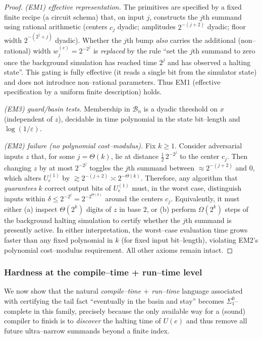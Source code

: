 \documentclass[12pt]{article}
\theoremstyle{definition}
\theoremstyle{plain}
\begin{document}
\begin{proof}
\emph{(EM1) effective representation.} The primitives are specified by a fixed finite recipe (a circuit schema) that, on input $j$, constructs the $j$th summand using rational arithmetic (centers $c_j$ dyadic; amplitudes $2^{-(j+2)}$ dyadic; floor width $2^{-(2^{j}+j)}$ dyadic). Whether the $j$th bump \emph{also} carries the additional (non–rational) width $w_j^{(e)}=2^{-2^{j}}$ is \emph{replaced} by the rule “set the $j$th summand to zero once the background simulation has reached time $2^j$ and has observed a halting state”. This gating is fully effective (it reads a single bit from the simulator state) and does not introduce non–rational parameters. Thus EM1 (effective specification by a uniform finite description) holds.

\emph{(EM3) guard/basin tests.} Membership in $\mathcal B_n$ is a dyadic threshold on $x$ (independent of $z$), decidable in time polynomial in the state bit–length and $\log(1/\varepsilon)$.

\emph{(EM2) failure (no polynomial cost–modulus).} Fix $k\ge1$. Consider adversarial inputs $z$ that, for some $j=\Theta(k)$, lie at distance $\tfrac12\,2^{-2^j}$ to the center $c_j$. Then changing $z$ by at most $2^{-2^j}$ toggles the $j$th summand between $\approx 2^{-(j+2)}$ and $0$, which alters $U_e^{(1)}$ by $\gtrsim 2^{-(j+2)}\asymp 2^{-\Theta(k)}$. Therefore, any algorithm that \emph{guarantees} $k$ correct output bits of $U_e^{(1)}$ must, in the worst case, distinguish inputs within $\delta\le 2^{-2^j}=2^{-2^{\Theta(k)}}$ around the centers $c_j$. Equivalently, it must either (a) inspect $\Theta(2^{k})$ digits of $z$ in base $2$, or (b) perform $\Omega(2^{k})$ steps of the background halting simulation to certify whether the $j$th summand is presently active. In either interpretation, the worst–case evaluation time grows faster than any fixed polynomial in $k$ (for fixed input bit–length), violating EM2’s polynomial cost–modulus requirement. All other axioms remain intact.
\end{proof}

\subsubsection*{Hardness at the compile–time + run–time level}
We now show that the natural \emph{compile–time $+$ run–time} language associated with certifying the tail fact “eventually in the basin and stay” becomes $\Sigma^0_1$–complete in this family, precisely because the only available way for a (sound) compiler to finish is to \emph{discover} the halting time of $U(e)$ and thus remove all future ultra–narrow summands beyond a finite index.
\end{document}
